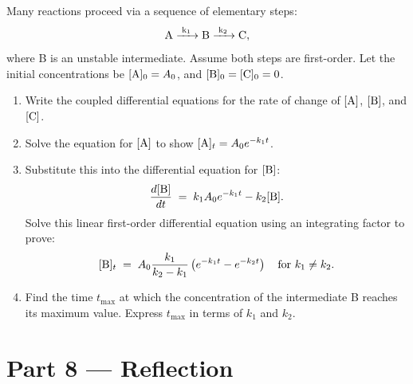 \documentclass[12pt, a4paper]{book}
\begin{document}
\begin{deepbox}
\begin{enumerate}[label=\textbf{D\arabic*.}]
        Many reactions proceed via a sequence of elementary steps:
        \[
          \ce{A ->[k_1] B ->[k_2] C},
        \]
        where B is an unstable intermediate. Assume both steps are first-order.
        Let the initial concentrations be $[\ce{A}]_0 = A_0$, and $[\ce{B}]_0 = [\ce{C}]_0 = 0$.
        \begin{enumerate}[label=(\alph*)]
          \item Write the coupled differential equations for the rate of change of $[\ce{A}]$, $[\ce{B}]$, and $[\ce{C}]$.
          \item Solve the equation for $[\ce{A}]$ to show $[\ce{A}]_t = A_0 e^{-k_1 t}$.
          \item Substitute this into the differential equation for $[\ce{B}]$:
          \[
            \frac{d[\ce{B}]}{dt} \;=\; k_1 A_0 e^{-k_1 t} - k_2 [\ce{B}].
          \]
          Solve this linear first-order differential equation using an integrating factor to prove:
          \[
            [\ce{B}]_t \;=\; A_0 \frac{k_1}{k_2 - k_1} \left( e^{-k_1 t} - e^{-k_2 t} \right) \quad \text{for } k_1 \neq k_2.
          \]
          \item Find the time $t_{\text{max}}$ at which the concentration of the intermediate B reaches its maximum value. Express $t_{\text{max}}$ in terms of $k_1$ and $k_2$.
        \end{enumerate}
\end{enumerate}
\end{deepbox}

\newpage

\section{Part 8 --- Reflection}
\end{document}
